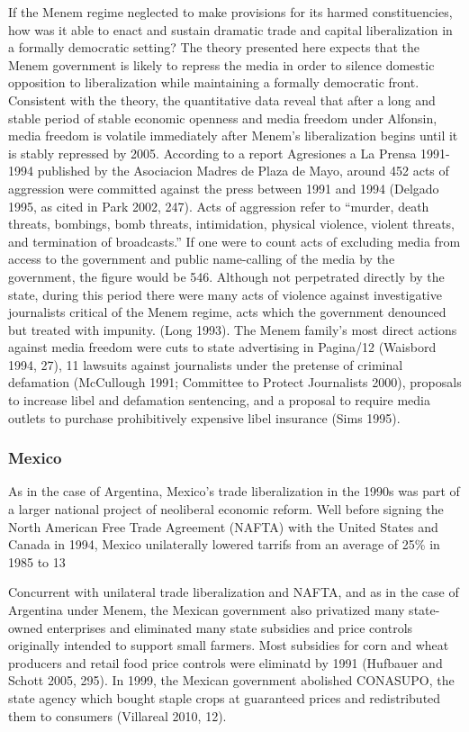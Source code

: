 \documentclass[a4paper]{article}\usepackage[]{graphicx}\usepackage[]{color}
\begin{document}
If the Menem regime neglected to make provisions for its harmed constituencies, how was it able to enact and sustain dramatic trade and capital liberalization in a formally democratic setting? The theory presented here expects that the Menem government is likely to repress the media in order to silence domestic opposition to liberalization while maintaining a formally democratic front. Consistent with the theory, the quantitative data reveal that after a long and stable period of stable economic openness and media freedom under Alfonsin, media freedom is volatile immediately after Menem's liberalization begins until it is stably repressed by 2005. According to a report Agresiones a La Prensa 1991-1994 published by the Asociacion Madres de Plaza de Mayo, around 452 acts of aggression were committed against the press between 1991 and 1994 (Delgado 1995, as cited in Park 2002, 247). Acts of aggression refer to “murder, death threats, bombings, bomb threats, intimidation, physical violence, violent threats, and termination of broadcasts.” If one were to count acts of excluding media from access to the government and public name-calling of the media by the government, the figure would be 546. Although not perpetrated directly by the state, during this period there were many acts of violence against investigative journalists critical of the Menem regime, acts which the government denounced but treated with impunity. (Long 1993). The Menem family's most direct actions against media freedom were cuts to state advertising in Pagina/12 (Waisbord 1994, 27), 11 lawsuits against journalists under the pretense of criminal defamation (McCullough 1991; Committee to Protect Journalists 2000), proposals to increase libel and defamation sentencing, and a proposal to require media outlets to purchase prohibitively expensive libel insurance (Sims 1995).

\subsubsection{Mexico}

As in the case of Argentina, Mexico's trade liberalization in the 1990s was part of a larger national project of neoliberal economic reform. Well before signing the North American Free Trade Agreement (NAFTA) with the United States and Canada in 1994, Mexico unilaterally lowered tarrifs from an average of 25\% in 1985 to 13%

Concurrent with unilateral trade liberalization and NAFTA, and as in the case of Argentina under Menem, the Mexican government also privatized many state-owned enterprises and eliminated many state subsidies and price controls originally intended to support small farmers. Most subsidies for corn and wheat producers and retail food price controls were eliminatd by 1991 (Hufbauer and Schott 2005, 295). In 1999, the Mexican government abolished CONASUPO, the state agency which bought staple crops at guaranteed prices and redistributed them to consumers (Villareal 2010, 12).
\end{document}
